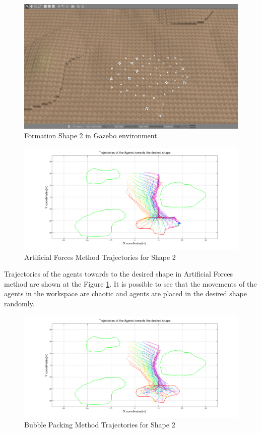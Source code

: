 \begin{figure}[H]
\caption{Formation Shape 2 in Gazebo environment}
\centerline{\includegraphics[scale = 0.32]{Trajectories_Formation_Shape_2_1}}
\end{figure} 	
		   
\begin{figure}[H]
\caption{Artificial Forces Method Trajectories for Shape 2} \label{arto2}
\centerline{\includegraphics[scale = 0.32]{Artificial_Trajectories_2}}
\end{figure} 	

Trajectories of the agents towards to the desired shape in Artificial Forces method are shown at the Figure \ref{arto2}. It is possible to see that the movements of the agents in the workspace are chaotic and agents are placed in the desired shape randomly.

		   
\begin{figure}[H]
\caption{Bubble Packing Method Trajectories for Shape 2} \label{bubble2}
\centerline{\includegraphics[scale = 0.32]{Bubble_Trajectories_2}}
\end{figure} 	
		   
